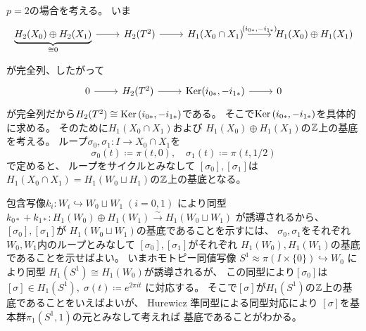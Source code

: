 \documentclass[report]{jlreq}
\begin{document}
\begin{answer}
    $p = 2$の場合を考える。
    いま
    \begin{equation}
        \begin{tikzcd}
            \underbrace{H_2(X_0) \oplus H_2(X_1)}_{\cong 0} \ar{r}
                & H_2(T^2) \ar{r}
                & H_1(X_0 \cap X_1)
                    \ar{r}{(i_{0*}, -i_{1*})}
                & H_1(X_0) \oplus H_1(X_1)
        \end{tikzcd}
    \end{equation}
    が完全列、したがって
    \begin{equation}
        \begin{tikzcd}
            0 \ar{r}
                & H_2(T^2) \ar{r}
                & \Ker (i_{0*}, -i_{1*}) \ar{r}
                & 0
        \end{tikzcd}
    \end{equation}
    が完全列だから$H_2(T^2) \cong \operatorname{\mathrm{Ker}} \, (i_{0*}, -i_{1*})$である。
    そこで$\operatorname{\mathrm{Ker}} \, (i_{0*}, -i_{1*})$を具体的に求める。
    そのために$H_1(X_0 \cap X_1)$および
    $H_1(X_0) \oplus H_1(X_1)$の$\mathbb{Z}$上の基底を考える。
    ループ$\sigma_0, \sigma_1 \colon I \to X_0 \cap X_1$を
    \begin{equation}
        \sigma_0(t) \coloneqq \pi(t, 0),
        \quad
        \sigma_1(t) \coloneqq \pi(t, 1/2)
    \end{equation}
    で定めると、
    ループをサイクルとみなして
    $[\sigma_0], [\sigma_1]$は
    $H_1(X_0 \cap X_1) = H_1(W_0 \sqcup H_1)$の$\mathbb{Z}$上の基底となる。
    \begin{innerproof}
        包含写像$k_i \colon W_i \hookrightarrow W_0 \sqcup W_1 \; (i = 0, 1)$
        により同型
        $k_{0*} + k_{1*}
            \colon H_1(W_0) \oplus H_1(W_1) \xrightarrow{\sim} H_1(W_0 \sqcup W_1)$
        が誘導されるから、
        $[\sigma_0], [\sigma_1]$が
        $H_1(W_0 \sqcup W_1)$の基底であることを示すには、
        $\sigma_0, \sigma_1$をそれぞれ$W_0, W_1$内のループとみなして
        $[\sigma_0], [\sigma_1]$がそれぞれ
        $H_1(W_0), H_1(W_1)$の基底であることを示せばよい。
        いまホモトピー同値写像
        $S^1 \approx \pi(I \times \{ 0 \}) \hookrightarrow W_0$
        により同型
        $H_1(S^1) \cong H_1(W_0)$が誘導されるが、
        この同型により$[\sigma_0]$は
        $[\sigma] \in H_1(S^1), \; \sigma(t) \coloneqq e^{2\pi it}$
        に対応する。
        そこで$[\sigma]$が$H_1(S^1)$の$\mathbb{Z}$上の基底であることをいえばよいが、
        Hurewicz 準同型による同型対応により
        $[\sigma]$を基本群$\pi_1(S^1, 1)$の元とみなして考えれば
        基底であることがわかる。

\end{innerproof}
\end{answer}
\end{document}
